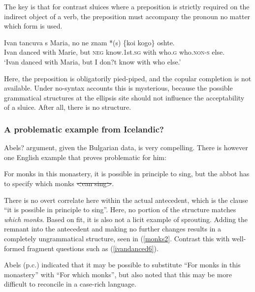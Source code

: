 \documentclass{turabian-researchpaper}
\begin{document}
The key is that for contrast sluices where a preposition is strictly required on the indirect object of a verb, the preposition must accompany the pronoun no matter which form is used. 

\begin{exe}
\ex\label{ivanleft4}
\gll Ivan tancuva s Maria, no ne  znam *(s) \{koi \textbar kogo\} oshte. \\
Ivan danced  with Marie, but \textsc{neg} know.1st.\textsc{sg} with who.\textsc{g} who.\textsc{non-s} else. \\
\trans `Ivan danced with Maria, but I don?t know with who else.'
\end{exe}


Here, the preposition is obligatorily pied-piped, and the copular completion is not available. Under no-syntax accounts this is mysterious, because the possible grammatical structures at the ellipsis site should not influence the acceptability of a sluice. After all, there is no structure. 

\subsubsection{A problematic example from Icelandic?}
Abels? argument, given the Bulgarian data, is very compelling. There is however one English example that proves problematic for him: 

\begin{exe}
\ex\label{monks1}
For monks in this monastery, it is possible in principle to sing, but the abbot has to specify which monks \sout{\textless can sing\textgreater}.
\end{exe}

There is no overt correlate here within the actual antecedent, which is the clause ``it is possible in principle to sing''. Here, no portion of the structure matches \textit{which monks}. Based on fit, it is also not a licit example of sprouting. Adding the remnant into the antecedent and making no further changes results in a completely ungrammatical structure, seen in (\ref{monks2}. Contrast this with well-formed fragment questions such as (\ref{ivandanced6}). 

\begin{exe}
\end{exe}

Abels (p.c.) indicated that it may be possible to substitute ``For monks in this monastery'' with ``For which monks'', but also noted that this may be more difficult to reconcile in a case-rich language. 
\end{document}
